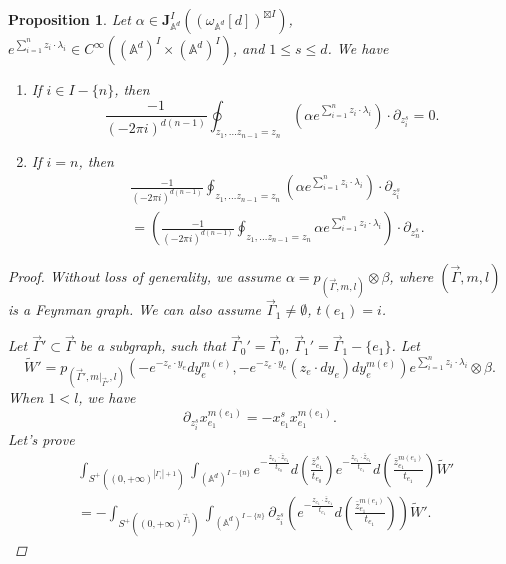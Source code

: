 \documentclass[11pt]{amsart}
\newtheorem{prop}[thm]{Proposition}
\theoremstyle{definition}
\theoremstyle{remark}
\numberwithin{equation}{section}
\begin{document}
\begin{prop}\label{residue 0}
    Let $\alpha\in \mathbf{J}^{ I}_{\mathbb{A}^{d}}((\omega_{\mathbb{A}^{d}}[d])^{\boxtimes I})$, $e^{\sum_{i=1}^{n}z_{i}\cdot\lambda_{i}}\in C^{\infty}((\mathbb{A}^{d})^{ I}\times (\mathbb{A}^{d})^{ I})$, and $1\leq s\leq d$. We have
    
    \begin{enumerate}
        \item If $i\in I-\{n\}$, then
        $$
        \frac{-1}{(-2\pi i)^{d(n-1)}}\oint_{z_{1},\dots z_{n-1}=z_{n}}\left(\alpha e^{\sum_{i=1}^{n}z_{i}\cdot\lambda_{i}}\right)\cdot \partial_{z_{i}^{s}}=0.
        $$
        \item If $i=n$, then
        \begin{align*}
            &\frac{-1}{(-2\pi i)^{d(n-1)}}\oint_{z_{1},\dots z_{n-1}=z_{n}}\left(\alpha e^{\sum_{i=1}^{n}z_{i}\cdot\lambda_{i}}\right)\cdot \partial_{z_{i}^{s}}\\
            &=\left(\frac{-1}{(-2\pi i)^{d(n-1)}}\oint_{z_{1},\dots z_{n-1}=z_{n}}\alpha e^{\sum_{i=1}^{n}z_{i}\cdot\lambda_{i}}\right)\cdot \partial_{z_{n}^{s}}.
        \end{align*}
    \end{enumerate}
    \begin{proof}
        Without loss of generality, we assume $\alpha=p_{(\vec{\Gamma},m,l)}\otimes\beta$, where $(\vec{\Gamma},m,l)$ is a Feynman graph. We can also assume $\vec{\Gamma}_{1}\neq\emptyset$, $t(e_{1})=i$. 
        
        Let $\vec{\Gamma}'\subset\vec{\Gamma}$ be a subgraph, such that $\vec{\Gamma}_{0}'=\vec{\Gamma}_{0}$, $\vec{\Gamma}_{1}'=\vec{\Gamma}_{1}-\{e_{1}\}$. Let
        $$
        \tilde{W}'=p_{(\vec{\Gamma}',m|_{\vec{\Gamma}'},l)}(-e^{-z_{e}\cdot y_{e}}dy_{e}^{m(e)},-e^{-z_{e}\cdot y_{e}}(z_{e}\cdot dy_{e})dy_{e}^{m(e)})e^{\sum_{i=1}^{n}z_{i}\cdot\lambda_{i}}\otimes \beta.
        $$
        When $1<l$, we have 
        $$
        \partial_{z_{i}^{s}}x_{e_{1}}^{m(e_{1})}=-x_{e_{1}}^{s}x_{e_{1}}^{m(e_{1})}.
        $$
        Let's prove
        \begin{align*}
            &\int_{S^{+}((0,+\infty)^{|\Gamma_{_{1}}|+1})}\int_{(\mathbb{A}^{d})^{ I-\{n\}}}
            e^{-\frac{z_{e_{1}}\cdot \bar{z}_{e_{1}}}{t_{e_{0}}}}d(\frac{\bar{z}_{e_{1}}^{s}}{t_{e_{0}}})e^{-\frac{z_{e_{1}}\cdot \bar{z}_{e_{1}}}{t_{e_{1}}}}d(\frac{\bar{z}_{e_{1}}^{m(e_{1})}}{t_{e_{1}}})\tilde{W}'\\
            &=
            -\int_{S^{+}((0,+\infty)^{\vec{\Gamma}_{1}})}\int_{(\mathbb{A}^{d})^{ I-\{n\}}}\partial_{z_{i}^{s}}\left(e^{-\frac{z_{e_{1}}\cdot \bar{z}_{e_{1}}}{t_{e_{1}}}}d(\frac{\bar{z}_{e_{1}}^{m(e_{1})}}{t_{e_{1}}})\right)\tilde{W}'.
        \end{align*}


\end{proof}
\end{prop}
\end{document}
